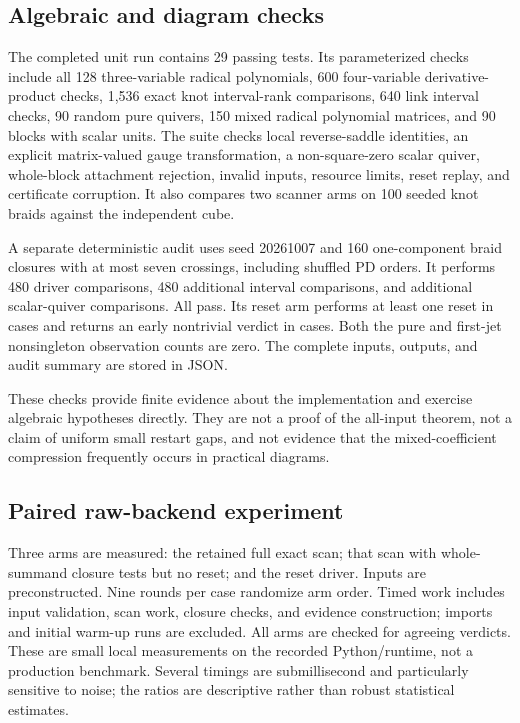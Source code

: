 \documentclass[11pt]{article}
\theoremstyle{definition}\newtheorem{definition}[theorem]{Definition}\newtheorem{example}[theorem]{Example}
\theoremstyle{remark}\newtheorem{remark}[theorem]{Remark}
\begin{document}
\subsection{Algebraic and diagram checks}
The completed unit run contains 29 passing tests. Its parameterized checks include all 128 three-variable radical polynomials, 600 four-variable derivative-product checks, 1,536 exact knot interval-rank comparisons, 640 link interval checks, 90 random pure quivers, 150 mixed radical polynomial matrices, and 90 blocks with scalar units. The suite checks local reverse-saddle identities, an explicit matrix-valued gauge transformation, a non-square-zero scalar quiver, whole-block attachment rejection, invalid inputs, resource limits, reset replay, and certificate corruption. It also compares two scanner arms on 100 seeded knot braids against the independent cube.

A separate deterministic audit uses seed 20261007 and 160 one-component braid closures with at most seven crossings, including shuffled PD orders. It performs 480 driver comparisons, 480 additional interval comparisons, and \AuditQuivers{} additional scalar-quiver comparisons. All pass. Its reset arm performs at least one reset in \AuditResets{} cases and returns an early nontrivial verdict in \AuditEarly{} cases. Both the pure and first-jet nonsingleton observation counts are zero. The complete inputs, outputs, and audit summary are stored in JSON.

These checks provide finite evidence about the implementation and exercise algebraic hypotheses directly. They are not a proof of the all-input theorem, not a claim of uniform small restart gaps, and not evidence that the mixed-coefficient compression frequently occurs in practical diagrams.

\subsection{Paired raw-backend experiment}
Three arms are measured: the retained full exact scan; that scan with whole-summand closure tests but no reset; and the reset driver. Inputs are preconstructed. Nine rounds per case randomize arm order. Timed work includes input validation, scan work, closure checks, and evidence construction; imports and initial warm-up runs are excluded. All arms are checked for agreeing verdicts. These are small local measurements on the recorded Python/runtime, not a production benchmark. Several timings are submillisecond and particularly sensitive to noise; the ratios are descriptive rather than robust statistical estimates.
\end{document}
